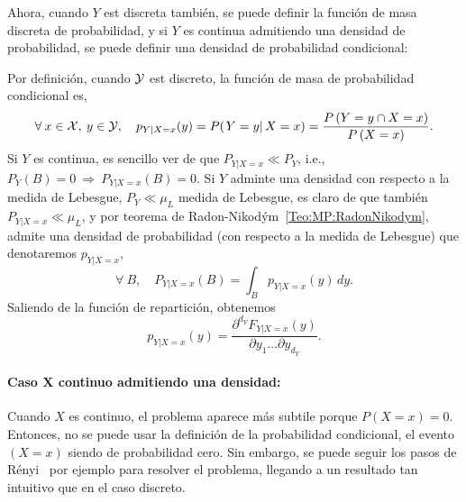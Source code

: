 Ahora, cuando $Y$ est discreta tambi\'en,  se puede definir la funci\'on de masa
discreta  de probabilidad,  y  si $Y$  es  continua admitiendo  una densidad  de
probabilidad, se puede definir una densidad de probabilidad condicional:
%
\begin{definicion}
\label{Def:MP:ReparticionCondicionalDiscreta}
%
  Por  definici\'on,  cuando  $\mathcal{Y}$  est   discreto,  la  funci\'on  de  masa  de
  probabilidad condicional es,
  \[
  \forall \:  x \in  \mathcal{X}, \: y  \in \mathcal{Y}, \quad  p_{Y|X=x}(y) =  P( \left. Y  = y
  \right|  X =  x  ) =  \frac{P\left(Y  = y  \cap X  =  x \right)}{P\left(X  =
      x\right)}.
  \]
  Si $Y$ es continua, es sencillo  ver de que $P_{Y|X=x} \ll P_Y$, i.e., $P_Y(B)
  = 0  \: \Rightarrow  \: P_{Y|X=x}(B) =  0$.  Si  $Y$ adminte una  densidad con
  respecto a la medida de Lebesgue, $P_Y \ll \mu_L$ medida de Lebesgue, es claro
  de    que   tambi\'en   $P_{Y|X=x}    \ll   \mu_L$,    y   por    teorema   de
  Radon-Nikod\'ym~\ref{Teo:MP:RadonNikodym}, admite una densidad de probabilidad
  (con respecto a la medida de Lebesgue) que denotaremos $p_{Y|X=x}$,
  \[
  \forall \: B, \quad P_{Y|X=x}(B) = \int_B p_{Y|X=x}(y) \, dy.
  \]
  Saliendo de la funci\'on de repartici\'on, obtenemos
  \[
  p_{Y|X=x}(y) = \frac{\partial^{d_Y} F_{Y|X=x}(y)}{\partial y_1 \ldots \partial
    y_{d_Y}}.
  \]
\end{definicion}



\paragraph{Caso $\boldsymbol{X}$ continuo admitiendo una densidad:}
Cuando  $X$ es  continuo, el  problema aparece  m\'as subtile  porque  $P(X=x) =
0$. Entonces, no  se puede usar la definici\'on  de la probabilidad condicional,
el evento $(X=x)$ siendo de probabilidad cero.  Sin embargo, se puede seguir los
pasos  de  R\'enyi~\cite[Cap.~5]{Ren} por  ejemplo  para  resolver el  problema,
llegando a un resultado tan intuitivo que en el caso discreto.

